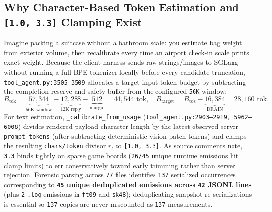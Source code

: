 \documentclass[10pt]{article}
\newcommand{\code}[1]{\texttt{#1}}
\begin{document}
\subsection{Why Character-Based Token Estimation and \code{[1.0, 3.3]} Clamping Exist}
Imagine packing a suitcase without a bathroom scale: you estimate bag weight from exterior volume, then recalibrate every time an airport check-in scale prints exact weight. Because the client harness sends raw strings/images to SGLang without running a full BPE tokenizer locally before every candidate truncation, \code{tool\_agent.py:3505--3509} allocates a target input token budget by subtracting the completion reserve and safety buffer from the configured \code{56K} window:
\begin{equation}
B_{\text{tok}} = \underbrace{57,344}_{56\text{K window}} - \underbrace{12,288}_{12\text{K reply}} - \underbrace{512}_{\text{margin}} = 44,544\text{ tok},\quad B_{\text{target}} = B_{\text{tok}} - \underbrace{16,384}_{\text{DRAIN}} = 28,160\text{ tok}.
\end{equation}
For text estimation, \code{\_calibrate\_from\_usage} (\code{tool\_agent.py:2903--2919, 5962--6008}) divides rendered payload character length by the latest observed server \code{prompt\_tokens} (after subtracting deterministic vision patch tokens) and clamps the resulting \code{chars/token} divisor $r_t$ to \code{[1.0, 3.3]}. As source comments note, \code{3.3} binds tightly on sparse game boards (\code{26/45} unique runtime emissions hit clamp limits) to err conservatively toward early trimming rather than server rejection. Forensic parsing across \code{77} files identifies \code{137} serialized occurrences corresponding to \textbf{\code{45} unique deduplicated emissions across \code{42} JSONL lines} (plus \code{2} \code{.log} emissions in \code{ft09} and \code{sk48}); deduplicating snapshot re-serializations is essential so \code{137} copies are never miscounted as \code{137} measurements.
\end{document}
